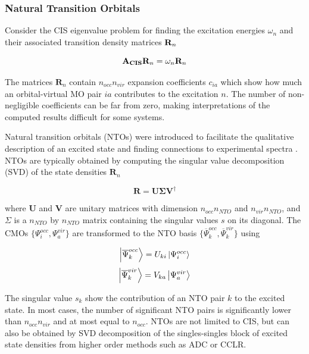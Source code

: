\subsubsection{Natural Transition Orbitals}

Consider the CIS eigenvalue problem for finding the excitation energies $\omega_n$ and their associated transition density matrices $\mathbf{R}_n$

\begin{equation}
\mathbf{A_{CIS}} \mathbf{R}_n = \omega_n \mathbf{R}_n 
\end{equation}

\noindent The matrices $\mathbf{R}_n$ contain $n_{occ}n_{vir}$ expansion coefficients $c_{ia}$ which show how much an orbital-virtual MO pair $ia$ contributes to the excitation $n$. The number of non-negligible coefficients can be far from zero, making interpretations of the computed results difficult for some systems.

Natural transition orbitals (NTOs) were introduced to facilitate the qualitative description of an excited state and finding connections to experimental spectra \cite{Luz1976, Mar2003}. NTOs are typically obtained by computing the singular value decomposition (SVD) of the state densities $\mathbf{R}_n$

\begin{equation}
\mathbf{R} = \mathbf{U} \mathbf{\Sigma} \mathbf{V}^{\dagger}  
\end{equation} 

\noindent where $\mathbf{U}$ and $\mathbf{V}$ are unitary matrices with dimension $n_{occ} n_{NTO}$ and $n_{vir}n_{NTO}$, and $\Sigma$ is a $n_{NTO}$ by $n_{NTO}$ matrix containing the singular values $s$ on its diagonal. The CMOs $\{\Psi^{occ}_i,\Psi^{vir}_a\}$ are transformed to the NTO basis $\{\overline{\Psi}^{occ}_k,\overline{\Psi}^{vir}_k\}$ using

\begin{equation}
\ket{\overline{\Psi}^{occ}_k} = U_{ki} \ket{\Psi^{occ}_i}
\end{equation}
\begin{equation}
\ket{\overline{\Psi}^{vir}_k} = V_{ka} \ket{\Psi^{vir}_a}
\end{equation}

\noindent The singular value $s_k$ show the contribution of an NTO pair $k$ to the excited state. In most cases, the number of significant NTO pairs is significantly lower than $n_{occ}n_{vir}$ and at most equal to $n_{occ}$. NTOs are not limited to CIS, but can also be obtained by SVD decomposition of the singles-singles block of excited state densities from higher order methods such as ADC or CCLR. 

